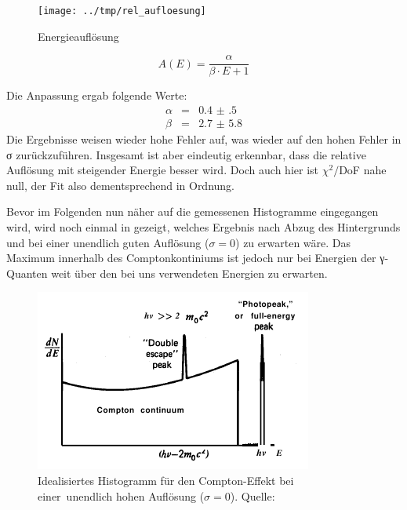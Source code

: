 \begin{figure}[htb]
      \centering
      \texttt{[image: ../tmp/rel\_aufloesung]}
      \caption{Energieauflösung}
      \label{fig:rel_aufloesung}
\end{figure}

\begin{equation}
 A(E) = \frac{\alpha}{\beta \cdot E + 1}
 \label{eqn:rel_aufloesung_anpassung}
\end{equation}

Die Anpassung ergab folgende Werte:
\begin{eqnarray}
 \alpha &=& \num{0.4(5)}  \\
 \beta &=& \num{2.7(58)}
\end{eqnarray}
Die Ergebnisse weisen wieder hohe Fehler auf, was wieder auf den hohen Fehler
in σ zurückzuführen. Insgesamt ist aber eindeutig erkennbar, dass die relative
Auflösung mit steigender Energie besser wird. Doch auch hier ist $\chi^2/$DoF
nahe null, der Fit also dementsprechend in Ordnung.

Bevor im Folgenden nun näher auf die gemessenen Histogramme eingegangen wird,
wird noch einmal in  gezeigt, welches Ergebnis nach Abzug
des Hintergrunds und bei einer unendlich guten Auflösung ($σ=0$) zu erwarten wäre.
Das Maximum innerhalb des Comptonkontiniums ist jedoch nur bei Energien der
γ-Quanten weit über den bei uns verwendeten Energien zu erwarten.

\begin{figure}[htb]
      \centering
      \includegraphics[width=1\columnwidth,keepaspectratio]{compton_ideal}
      \caption{Idealisiertes Histogramm für den Compton-Effekt bei einer\
               unendlich hohen Auflösung ($σ=0$). Quelle: \cite[Kap. 10]{chap10}}
      \label{fig:rel_aufloesung}
\end{figure}

